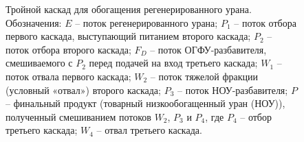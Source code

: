 \begin{figure}[ht]
  \caption{Тройной каскад для обогащения регенерированного урана. Обозначения: $E$ -- поток регенерированного урана; $P_1$ -- поток отбора первого каскада, выступающий питанием второго каскада; $P_2$ -- поток отбора второго каскада; $F_{D}$ -- поток ОГФУ-разбавителя, смешиваемого с $P_2$ перед подачей на вход третьего каскада; $W_1$ -- поток отвала первого каскада; $W_2$ -- поток тяжелой фракции (условный «отвал») второго каскада; $P_3$ -- поток НОУ-разбавителя; $P$ -- финальный продукт (товарный низкообогащенный уран (НОУ)), полученный смешиванием потоков $W_2$, $P_3$ и $P_4$, где $P_4$ -- отбор третьего каскада; $W_4$ -- отвал третьего каскада.}\label{p2_withDepU}
\end{figure}

